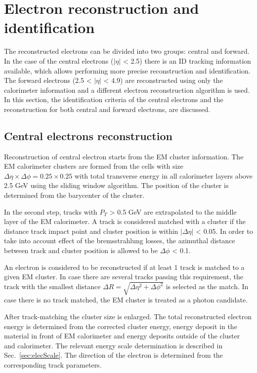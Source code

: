 \section{Electron reconstruction and identification}\label{sec:ElecRec}

The reconstructed electrons can be divided into two groups: central and forward. In the case of the central electrons ($| \eta |$ < 2.5) there is an ID tracking information available, which allows performing more precise reconstruction and identification. The forward   electrons (2.5 < $| \eta |$ < 4.9) are reconstructed using only the calorimeter information and a different electron reconstruction algorithm is used. In this section, the identification criteria of the central electrons and the reconstruction for both central and forward electrons, are discussed.

\subsection{Central electrons reconstruction}
Reconstruction of central electron starts from the EM cluster information.  The EM calorimeter clusters are formed from the cells with size $\Delta \eta \times \Delta \phi = 0.25 \times 0.25$ with total transverse energy in all calorimeter layers above 2.5 GeV using the sliding window algorithm\cite{ElecClust}. The position of the cluster is determined from the barycenter of the cluster.

In the second step, tracks with $P_{T}$ > 0.5 GeV are extrapolated to the middle layer of the EM calorimeter. A track is considered matched with a cluster if the distance track impact point and cluster position is  within $|\Delta\eta|$ < 0.05. In order to take into account effect of the bremsstrahlung losses, the azimuthal distance between track and cluster position is allowed to be $\Delta\phi$ < 0.1.

An electron is considered to be reconstructed if at least 1 track is matched to a given EM cluster. In case there are several tracks passing this requirement, the track with the smallest distance $\Delta R = \sqrt{\Delta\eta^2+\Delta\phi^2}$ is selected as the match. In case there is no track matched, the EM cluster is treated as a photon candidate.

After track-matching the cluster size is enlarged. The total reconstructed electron energy is determined from the corrected cluster energy, energy deposit in the material in front of EM calorimeter and energy deposits outside of the cluster and calorimeter. The relevant energy scale determination is described in Sec.~\ref{sec:elecScale}. The direction of the electron is determined from the corresponding track parameters. 



